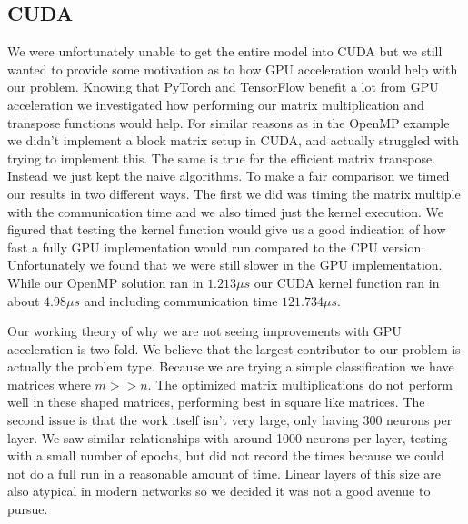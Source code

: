 \subsection{CUDA}\label{sec:r-cuda}
We were unfortunately unable to get the entire model into CUDA but we still
wanted to provide some motivation as to how GPU acceleration would help with our
problem. Knowing that PyTorch and TensorFlow benefit a lot from GPU acceleration
we investigated how performing our matrix multiplication and transpose functions
would help. For similar reasons as in the OpenMP example we didn't implement a
block matrix setup in CUDA, and actually struggled with trying to implement
this. The same is true for the efficient matrix transpose. Instead we just kept
the naive algorithms. To make a fair comparison we timed our results in two
different ways. The first we did was timing the matrix multiple with the
communication time and we also timed just the kernel execution. We figured that
testing the kernel function would give us a good indication of how fast a fully
GPU implementation would run compared to the CPU version. Unfortunately we found
that we were still slower in the GPU implementation. While our OpenMP solution ran
in $1.213\mu s$ our CUDA kernel function ran in about $4.98\mu s$ and including
communication time $121.734\mu s$.

Our working theory of why we are not seeing improvements with GPU acceleration
is two fold. We believe that the largest contributor to our problem is actually
the problem type. Because we are trying a simple classification we have matrices
where $m>>n$. The optimized matrix multiplications do not perform well in these
shaped matrices, performing best in square like matrices. The second issue is
that the work itself isn't very large, only having 300 neurons per layer. We saw
similar relationships with around 1000 neurons per layer, testing with a small
number of epochs, but did not record the times because we could not do a full
run in a reasonable amount of time. Linear layers of this size are also atypical
in modern networks so we decided it was not a good avenue to pursue. 
